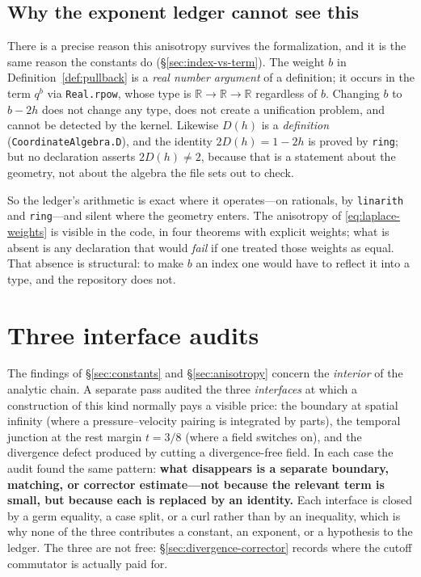 \documentclass[11pt]{article}
\newcommand{\R}{\mathbb{R}}
\newcommand{\ct}[1]{\texttt{#1}}
\theoremstyle{plain}
\theoremstyle{definition}
\theoremstyle{remark}
\begin{document}
\subsection{Why the exponent ledger cannot see this}
\label{sec:ledger-cannot}

There is a precise reason this anisotropy survives the formalization, and it is
the same reason the constants do (\S\ref{sec:index-vs-term}). The weight $b$ in
Definition~\ref{def:pullback} is a \emph{real number argument} of a definition;
it occurs in the term $q^{b}$ via \ct{Real.rpow}, whose type is
$\R\to\R\to\R$ regardless of $b$. Changing $b$ to $b-2h$ does not change any
type, does not create a unification problem, and cannot be detected by the
kernel. Likewise $D(h)$ is a \emph{definition} (\ct{CoordinateAlgebra.D}), and
the identity $2D(h)=1-2h$ is proved by \ct{ring}; but no declaration asserts
$2D(h)\neq2$, because that is a statement about the geometry, not about the
algebra the file sets out to check.

So the ledger's arithmetic is exact where it operates---on rationals, by
\ct{linarith} and \ct{ring}---and silent where the geometry enters. The
anisotropy of \eqref{eq:laplace-weights} is visible in the code, in four
theorems with explicit weights; what is absent is any declaration that would
\emph{fail} if one treated those weights as equal. That absence is structural: to
make $b$ an index one would have to reflect it into a type, and the repository
does not.

\section{Three interface audits}
\label{sec:interfaces}

The findings of \S\ref{sec:constants} and \S\ref{sec:anisotropy} concern the
\emph{interior} of the analytic chain. A separate pass audited the three
\emph{interfaces} at which a construction of this kind normally pays a visible
price: the boundary at spatial infinity (where a pressure--velocity pairing is
integrated by parts), the temporal junction at the rest margin $t=3/8$ (where a
field switches on), and the divergence defect produced by cutting a
divergence-free field. In each case the audit found the same pattern: \textbf{what disappears is a
separate boundary, matching, or corrector estimate---not because the relevant
term is small, but because each is replaced by an identity.} Each interface is
closed by a germ equality, a case split, or a curl rather than by an inequality,
which is why none of the three contributes a constant, an exponent, or a
hypothesis to the ledger. The three are not free: \S\ref{sec:divergence-corrector}
records where the cutoff commutator is actually paid for.
\end{document}
